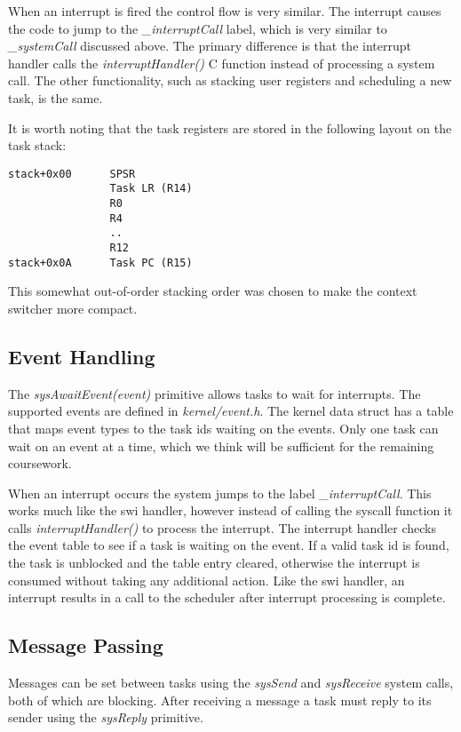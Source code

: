 \documentclass[twoside,a4paper]{refart}
\begin{document}
When an interrupt is fired the control flow is very similar. The interrupt causes the code to jump to the \textit{\_interruptCall} label, which is very similar to \textit{\_systemCall} discussed above. The primary difference is that the interrupt handler calls the  \textit{interruptHandler()} C function instead of processing a system call. The other functionality, such as stacking user registers and scheduling a new task, is the same.

It is worth noting that the task registers are stored in the following layout on the task stack:

\begin{verbatim}
stack+0x00      SPSR
                Task LR (R14)
                R0
                R4
                ..
                R12
stack+0x0A      Task PC (R15)
\end{verbatim}
This somewhat out-of-order stacking order was chosen to make the context switcher more compact.

\subsection{Event Handling}
The \textit{sysAwaitEvent(event)} primitive allows tasks to wait for interrupts. The supported events are defined in \textit{kernel/event.h}. The kernel data struct has a table that maps event types to the task ids waiting on the events. Only one task can wait on an event at a time, which we think will be sufficient for the remaining coursework.

When an interrupt occurs the system jumps to the label \textit{\_interruptCall}. This works much like the swi handler, however instead of calling the syscall function it calls \textit{interruptHandler()} to process the interrupt. The interrupt handler checks the event table to see if a task is waiting on the event. If a valid task id is found, the task is unblocked and the table entry cleared, otherwise the interrupt is consumed without taking any additional action. Like the swi handler, an interrupt results in a call to the scheduler after interrupt processing is complete.

\subsection{Message Passing}
Messages can be set between tasks using the \textit{sysSend} and \textit{sysReceive} system calls, both of which are blocking. After receiving a message a task must reply to its sender using the \textit{sysReply} primitive.
\end{document}
